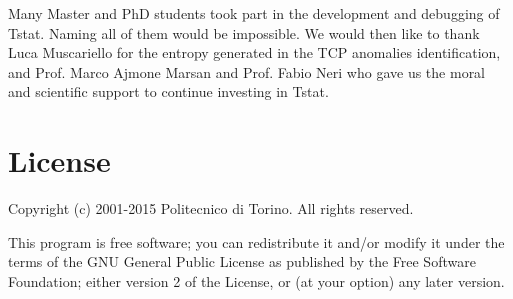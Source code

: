 \documentclass[11pt]{article}
\newcommand{\printindex}[0]{} %
\begin{document}
Many Master and PhD students took part in the development and debugging of
Tstat. Naming all of them would be impossible. We would then like to thank Luca
Muscariello for the entropy generated in the TCP
anomalies identification, and Prof. Marco Ajmone Marsan and 
Prof. Fabio Neri who gave us the moral and scientific support to 
continue investing in Tstat.

\section{License\label{License}}


Copyright (c) 2001-2015 Politecnico di Torino.  All rights reserved.



This program is free software; you can redistribute it and/or modify
it under the terms of the GNU General Public License as published by
the Free Software Foundation; either version 2 of the License, or
(at your option) any later version.

\printindex
\end{document}
